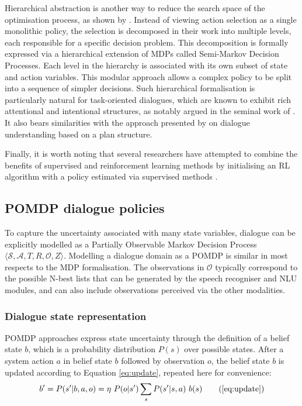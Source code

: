 Hierarchical abstraction is another way to reduce the search space of the optimisation process, as shown by \cite{Heriberto2011}. Instead of viewing action selection as a single monolithic policy, the selection is decomposed in their work into multiple levels, each responsible for a specific decision problem.  This decomposition is formally expressed via a hierarchical extension of MDPs called Semi-Markov Decision Processes.  Each level in the hierarchy is associated with its own subset of state and action variables.  This modular approach allows a complex policy to be split into a sequence of simpler decisions.  Such hierarchical formalisation is particularly natural for task-oriented dialogues, which are known to exhibit rich attentional and intentional structures, as notably argued in the seminal work of \cite{Grosz:1986}. It also bears similarities with the approach presented by \cite{Litman87} on dialogue understanding based on a plan structure. 

Finally, it is worth noting that several researchers have attempted to combine the benefits of supervised and reinforcement learning methods by initialising an RL algorithm with a policy estimated via supervised methods \citep{williams2003, rieser2006}.

\subsection{POMDP dialogue policies}

To capture the uncertainty associated with many state variables, dialogue can be explicitly modelled as a Partially Observable Markov Decision Process $\langle \mathcal{S}, \mathcal{A}, T, R, \mathcal{O}, Z \rangle$.  Modelling a dialogue domain as a POMDP is similar in most respects to the MDP formalisation.  The observations in $\mathcal{O}$ typically correspond to the possible N-best lists that can be generated by the speech recogniser and NLU modules, and can also include observations perceived via the other modalities.  

\subsubsection*{Dialogue state representation}

POMDP approaches express state uncertainty through the definition of a belief state $b$, which is a probability distribution $P(s)$ over possible states.  After a system action $a$ in belief state $b$ followed by observation $o$, the belief state $b$ is updated according to Equation \eqref{eq:update}, repeated here for convenience:
\begin{align}
b' = P(s'|b, a,o) = \eta \ P(o|s') \sum_{s} P(s'|s,a) \ b(s)   \tag{\ref{eq:update}}
\end{align}

